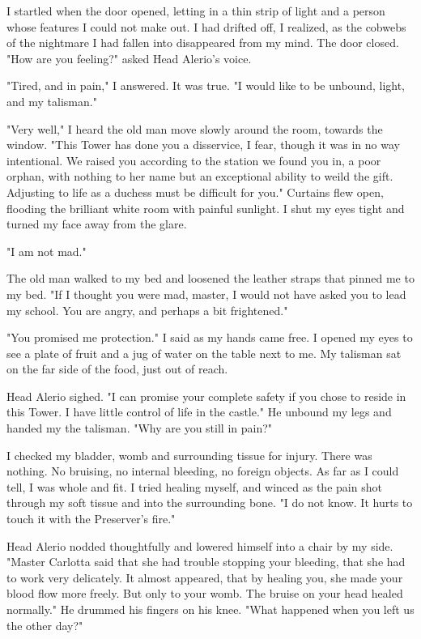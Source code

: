 \documentclass{article}
\begin{document}
I startled when the door opened, letting in a thin strip of light and a person whose features I could not make out. I had drifted off, I realized, as the cobwebs of the nightmare I had fallen into disappeared from my mind. The door closed. "How are you feeling?" asked Head Alerio's voice.

"Tired, and in pain," I answered. It was true. "I would like to be unbound, light, and my talisman."

"Very well," I heard the old man move slowly around the room, towards the window. "This Tower has done you a disservice, I fear, though it was in no way intentional. We raised you according to the station we found you in, a poor orphan, with nothing to her name but an exceptional ability to weild the gift. Adjusting to life as a duchess must be difficult for you." Curtains flew open, flooding the brilliant white room with painful sunlight. I shut my eyes tight and turned my face away from the glare.

"I am not mad."

The old man walked to my bed and loosened the leather straps that pinned me to my  bed. "If I thought you were mad, master,  I would not have asked you to lead my school. You are angry, and perhaps a bit frightened."

"You promised me protection." I said as my hands came free. I opened my eyes to see a plate of fruit and a jug of water on the table next to me. My talisman sat on the far side of the food, just out of reach.

Head Alerio sighed. "I can promise your complete safety if you chose to reside in this Tower. I have little control of life in the castle." He unbound my legs and handed my the talisman. "Why are you still in pain?"

I checked my bladder, womb and surrounding tissue for injury. There was nothing. No bruising, no internal bleeding, no foreign objects. As far as I could tell, I was whole and fit. I tried healing myself, and winced as the pain shot through my soft tissue and into the surrounding bone. "I do not know. It hurts to touch it with the Preserver's fire."

Head Alerio nodded thoughtfully and lowered himself into a chair by my side. "Master Carlotta said that she had trouble stopping your bleeding, that she had to work very delicately. It almost appeared, that by healing you, she made your blood flow more freely. But only to your womb. The bruise on your head healed normally." He drummed his fingers on his knee. "What happened when you left us the other day?"
\end{document}
